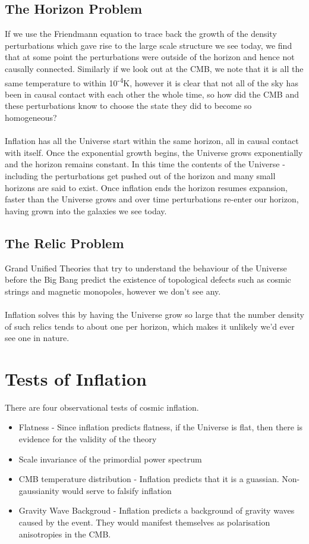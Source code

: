 \documentclass[12pt]{report}
\begin{document}
\begin{itemize}
\begin{itemize}
\subsection{The Horizon Problem}
If we use the Friendmann equation to trace back the growth of the density perturbations which gave rise to the large scale structure we see today, we find that at some point the perturbations were outside of the horizon and hence not causally connected. Similarly if we look out at the CMB, we note that it is all the same temperature to within 10\textsuperscript{-4}K, however it is clear that not all of the sky has been in causal contact with each other the whole time, so how did the CMB and these perturbations know to choose the state they did to become so homogeneous?
\\\\
Inflation has all the Universe start within the same horizon, all in causal contact with itself. Once the exponential growth begins, the Universe grows exponentially and the horizon remains constant. In this time the contents of the Universe - including the perturbations get pushed out of the horizon and many small horizons are said to exist. Once inflation ends the horizon resumes expansion, faster than the Universe grows and over time perturbations re-enter our horizon, having grown into the galaxies we see today.

\subsection{The Relic Problem}
Grand Unified Theories that try to understand the behaviour of the Universe before the Big Bang predict the existence of topological defects such as cosmic strings and magnetic monopoles, however we don't see any.
\\\\
Inflation solves this by having the Universe grow so large that the number density of such relics tends to about one per horizon, which makes it unlikely we'd ever see one in nature.

\section{Tests of Inflation}
There are four observational tests of cosmic inflation.
\begin{itemize}
\item Flatness - Since inflation predicts flatness, if the Universe is flat, then there is evidence for the validity of the theory
\item Scale invariance of the primordial power spectrum
\item CMB temperature distribution - Inflation predicts that it is a guassian. Non-gaussianity would serve to falsify inflation
\item Gravity Wave Backgroud - Inflation predicts a background of gravity waves caused by the event. They would manifest themselves as polarisation anisotropies in the CMB.
\end{itemize}


\end{itemize}
\end{itemize}
\end{document}
